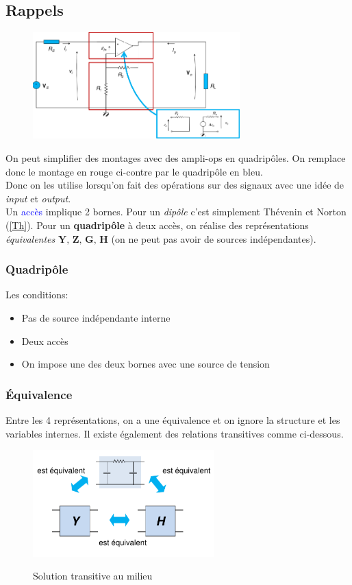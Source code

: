 \documentclass{report}
\begin{document}
\subsection{Rappels}
\begin{figure}
\centering
\includegraphics[width=8cm]{img/QuadriAmp.png}
\end{figure}
On peut simplifier des montages avec des ampli-ops en quadripôles. On remplace donc le montage en rouge ci-contre par le quadripôle en bleu.\\
Donc on les utilise lorsqu'on fait des opérations sur des signaux avec une idée de \textit{input} et \textit{output}.\\
Un \textcolor{blue}{accès} implique 2 bornes. Pour un \textit{dipôle} c'est simplement Thévenin et Norton (\ref{Th}). Pour un \textbf{quadripôle} à deux accès, on réalise des représentations \textit{équivalentes} $\textbf{Y, Z, G, H}$ (on ne peut pas avoir de sources indépendantes).

\subsubsection{Quadripôle}
Les conditions:
\begin{itemize}
\item Pas de source indépendante interne
\item Deux accès
\item On impose une des deux bornes avec une source de tension
\end{itemize}

\subsubsection{Équivalence}
Entre les 4 représentations, on a une équivalence et on ignore la structure et les variables internes. Il existe également des relations transitives comme ci-dessous.
\begin{figure}[H]
\centering
\includegraphics[width=7cm]{img/Trans.png} \label{img:trans}
\caption{Solution transitive au milieu}
\end{figure}
\end{document}
